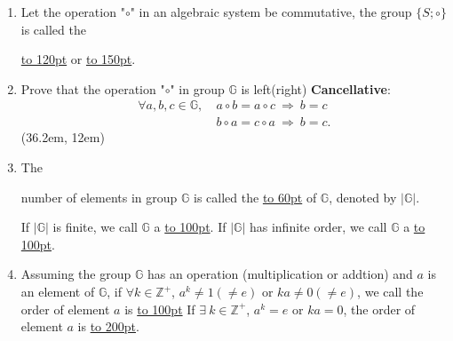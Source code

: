 \documentclass[12pt]{scrartcl}
\begin{document}
{{\begin{enumerate}[label=(\alph*)]
		\begin{itemize}[leftmargin=50pt]
		\item $\forall a \in S, ~ \exists ~ a^{-1} \in S$, so $a^{-1} \circ a = e$;
		\item $\forall a \in S, ~ \exists ~ e \in S$, so $a \circ e = a$.\\
		\end{itemize} 
		\framebox(36.2em, 15em){}


	\item Let the operation "$\circ$" in an algebraic system be commutative, the group $\{S; \circ\}$ is called the \rule{0pt}{15pt}\underline{\hbox to 120pt{}} or \underline{\hbox to 150pt{}}. \\


	\item Prove that the operation "$\circ$" in group $\mathbb{G}$ is left(right) \textbf{Cancellative}: 
	\begin{align*}
	\forall a, b, c \in \mathbb{G}, ~ &a \circ b = a \circ c ~ \Longrightarrow ~ b = c \\
	&b \circ a = c \circ a ~ \Longrightarrow ~ b = c.
	\end{align*}
	\framebox(36.2em, 12em){} \\

	\item The \rule{0pt}{20pt}number of elements in group $\mathbb{G}$ is called the \underline{\hbox to 60pt{}} of $\mathbb{G}$, denoted by $|\mathbb{G}|$. 

	\begin{spacing}{1.2}If $|\mathbb{G}|$ is finite, we call $\mathbb{G}$ a \underline{\hbox to 100pt{}}.  If $|\mathbb{G}|$ has infinite order, we call $\mathbb{G}$ a \underline{\hbox to 100pt{}}.\end{spacing}

	\item \begin{spacing}{1.3}Assuming the group $\mathbb{G}$ has an operation (multiplication or addtion) and $a$ is an element of $\mathbb{G}$, if $\forall k \in \mathbb{Z}^+$, $a^{k} \neq 1 (\neq e)$ or $ka \neq 0 (\neq e)$, we call the order of element $a$ is \underline{\hbox to 100pt{}} If $\exists ~ k \in \mathbb{Z}^+$, $a^{k} = e$ or $ka = 0$, the order of element $a$ is \underline{\hbox to 200pt{}}. \end{spacing}


	\end{enumerate}


}}
\end{document}

